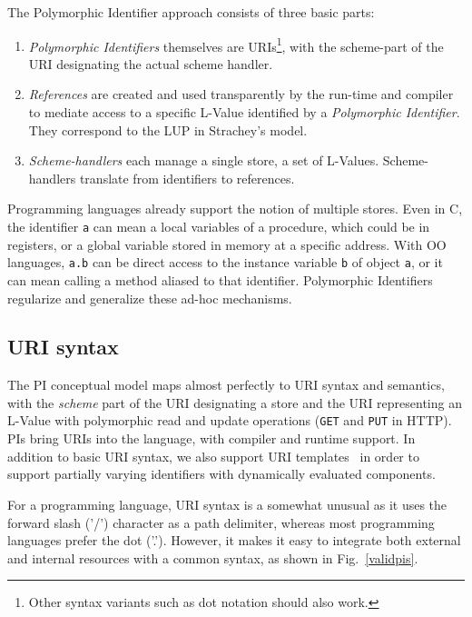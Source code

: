 \documentclass[preprint]{sigplanconf}
\begin{document}
The Polymorphic Identifier approach consists of three basic parts:
\begin{enumerate}
\item \emph{Polymorphic Identifiers} themselves are URIs\footnote{Other syntax variants such as dot notation should also work.}, with the scheme-part of the URI designating the actual scheme handler.
	
\item \emph{References} are created and used transparently by the run-time and compiler
	to mediate access to a specific L-Value identified by a \emph{Polymorphic Identifier}.
	They correspond to the LUP in Strachey's model.  

\item \emph{Scheme-handlers} each manage a single store, a set of L-Values.  Scheme-handlers 
	translate from identifiers to references.
	
	
\end{enumerate}

Programming languages already support the notion of multiple stores.  Even in C, the identifier {\tt a}
can mean a local variables of a procedure, which could be in registers, or a global
variable stored in memory at a specific address.  With OO languages, {\tt a.b} can be direct
access to the instance variable {\tt b} of object {\tt a}, or it can mean calling a method aliased
to that identifier.  Polymorphic Identifiers regularize and generalize these ad-hoc mechanisms.

\subsection{URI syntax}

The PI conceptual model maps almost perfectly to URI syntax and semantics, with the \emph{scheme}
part of the URI designating a store and the URI representing an L-Value with polymorphic read
and update operations ({\tt GET} and {\tt PUT} in HTTP).  PIs bring URIs into the language, with
compiler and runtime support.  In addition to basic URI syntax, we also support URI templates~\cite{rfc6570}
in order to support partially varying identifiers with dynamically evaluated components.

For a programming language, URI syntax is a somewhat unusual as it uses the forward slash ('/')
character as a path delimiter, whereas most programming languages prefer the dot ('.').  However,
it makes it easy to integrate both external and internal resources with a common syntax, as shown 
in Fig.~\ref{validpis}.
\end{document}

